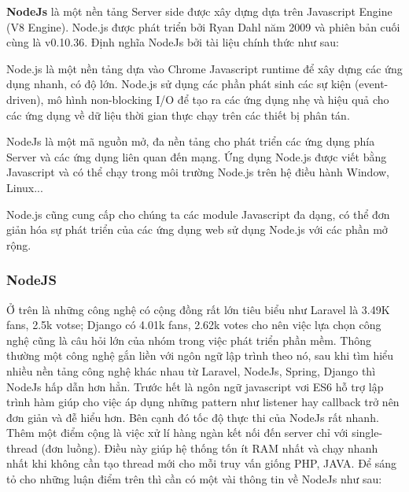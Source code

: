 \textbf{NodeJs} là một nền tảng Server side được xây dựng dựa trên Javascript Engine (V8 Engine). Node.js được phát triển bởi Ryan Dahl năm 2009 và phiên bản cuối cùng là v0.10.36. Định nghĩa NodeJs bởi tài liệu chính thức như sau:

Node.js là một nền tảng dựa vào Chrome Javascript runtime để xây dựng các ứng dụng nhanh, có độ lớn. Node.js sử dụng các phần phát sinh các sự kiện (event-driven), mô hình non-blocking I/O để tạo ra các ứng dụng nhẹ và hiệu quả cho các ứng dụng về dữ liệu thời gian thực chạy trên các thiết bị phân tán.

NodeJs là một mã nguồn mở, đa nền tảng cho phát triển các ứng dụng phía Server và các ứng dụng liên quan đến mạng. Ứng dụng Node.js được viết bằng Javascript và có thể chạy trong môi trường Node.js trên hệ điều hành Window, Linux...

Node.js cũng cung cấp cho chúng ta các module Javascript đa dạng, có thể đơn giản hóa sự phát triển của các ứng dụng web sử dụng Node.js với các phần mở rộng.

\subsubsection{NodeJS}
Ở trên là những công nghệ có cộng đồng rất lớn tiêu biểu như Laravel là 3.49K fans, 2.5k votse; Django có 4.01k fans, 2.62k votes cho nên việc lựa chọn công nghệ cũng là câu hỏi lớn của nhóm trong việc phát triển phần mềm. Thông thường một công nghệ gắn liền với ngôn ngữ lập trình theo nó, sau khi tìm hiểu nhiều nền tảng công nghệ khác nhau từ Laravel, NodeJs, Spring, Django thì NodeJs hấp dẫn hơn hẳn. Trước hết là ngôn ngữ javascript vơi ES6 hỗ trợ lập trình hàm giúp cho  việc áp dụng những pattern như listener hay callback trở nên đơn giản và đễ hiểu hơn.  Bên cạnh đó tốc độ thực thi của NodeJs rất nhanh. Thêm một điểm cộng là việc xử lí hàng ngàn kết nối đến server chỉ với single-thread (đơn luồng). Điều này giúp hệ thống tốn ít RAM nhất và chạy nhanh nhất khi không cần tạo thread mới cho mỗi truy vấn giống PHP, JAVA. Để sáng tỏ cho những luận điểm trên thì cần có một vài thông tin về NodeJs như sau:

